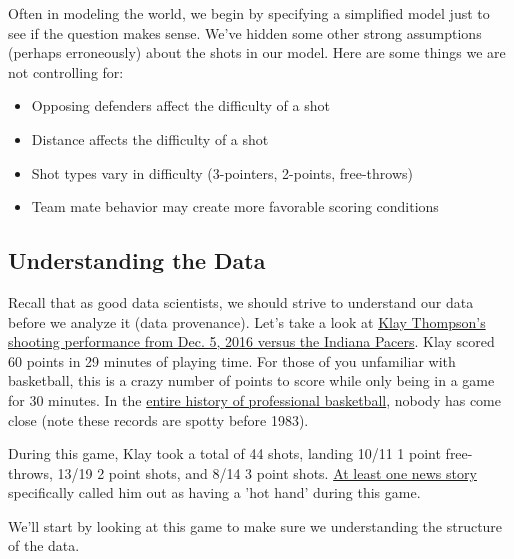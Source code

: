 \documentclass[11pt]{article}
\providecommand{\tightlist}{%
      \setlength{\itemsep}{0pt}\setlength{\parskip}{0pt}}
\begin{document}
Often in modeling the world, we begin by specifying a simplified model
just to see if the question makes sense. We've hidden some other strong
assumptions (perhaps erroneously) about the shots in our model. Here are
some things we are not controlling for:

\begin{itemize}
\tightlist
\item
  Opposing defenders affect the difficulty of a shot
\item
  Distance affects the difficulty of a shot
\item
  Shot types vary in difficulty (3-pointers, 2-points, free-throws)
\item
  Team mate behavior may create more favorable scoring conditions
\end{itemize}

\subsection{Understanding the Data}\label{understanding-the-data}

Recall that as good data scientists, we should strive to understand our
data before we analyze it (data provenance). Let's take a look at
\href{https://www.basketball-reference.com/play-index/shooting.fcgi?player_id=thompkl01\&year_id=2017\&opp_id=IND\&game_location=H}{Klay
Thompson's shooting performance from Dec. 5, 2016 versus the Indiana
Pacers}. Klay scored 60 points in 29 minutes of playing time. For those
of you unfamiliar with basketball, this is a crazy number of points to
score while only being in a game for 30 minutes. In the
\href{https://www.basketball-reference.com/play-index/pgl_finder.cgi?request=1\&match=game\&is_playoffs=N\&age_min=0\&age_max=99\&pos_is_g=Y\&pos_is_gf=Y\&pos_is_f=Y\&pos_is_fg=Y\&pos_is_fc=Y\&pos_is_c=Y\&pos_is_cf=Y\&c1stat=mp\&c1comp=lt\&c1val=30\&order_by=pts}{entire
history of professional basketball}, nobody has come close (note these
records are spotty before 1983).

During this game, Klay took a total of 44 shots, landing 10/11 1 point
free-throws, 13/19 2 point shots, and 8/14 3 point shots.
\href{https://www.usatoday.com/story/sports/nba/warriors/2016/12/06/klay-thompson-60-points-outburst-by-the-numbers-warriors-pacers/95030316/}{At
least one news story} specifically called him out as having a 'hot hand'
during this game.

We'll start by looking at this game to make sure we understanding the
structure of the data.
\end{document}

